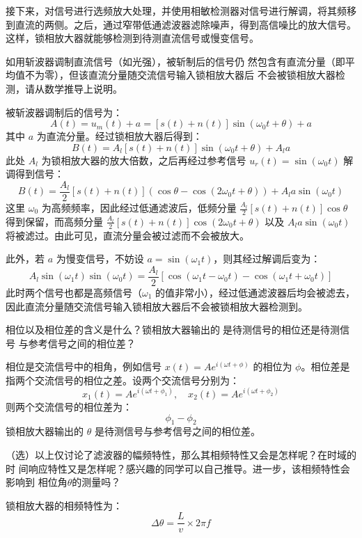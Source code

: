 \documentclass[dvipsnames, svgnames,a4paper,11pt]{article}
\begin{document}
接下来，对信号进行选频放大处理，并使用相敏检测器对信号进行解调，将其频移到直流的两侧。之后，通过窄带低通滤波器滤除噪声，得到高信噪比的放大信号。这样，锁相放大器就能够检测到待测直流信号或慢变信号。

	\begin{question}
		如用斩波器调制直流信号（如光强），被斩制后的信号仍
然包含有直流分量（即平均值不为零），但该直流分量随交流信号输入锁相放大器后
不会被锁相放大器检测，请从数学推导上说明。
	\end{question}
	被斩波器调制后的信号为：
\[
A(t) = u_m(t) + a = [s(t) + n(t)] \sin(\omega_0 t + \theta) + a
\]
其中 \(a\) 为直流分量。经过锁相放大器后得到：
\[
B(t) = A_l [s(t) + n(t)] \sin(\omega_0 t + \theta) + A_l a
\]
此处 \(A_l\) 为锁相放大器的放大倍数，之后再经过参考信号 \(u_r(t) = \sin(\omega_0 t)\) 解调得到信号：
\[
B(t) = \frac{A_l}{2} [s(t) + n(t)] (\cos \theta - \cos(2 \omega_0 t + \theta)) + A_l a \sin(\omega_0 t)
\]
这里 \(\omega_0\) 为高频频率，因此经过低通滤波后，低频分量 \(\frac{A_l}{2} [s(t) + n(t)] \cos \theta\) 得到保留，而高频分量 \(\frac{A_l}{2} [s(t) + n(t)] \cos(2 \omega_0 t + \theta)\) 以及 \(A_l a \sin(\omega_0 t)\) 将被滤过。由此可见，直流分量会被过滤而不会被放大。

此外，若 \(a\) 为慢变信号，不妨设 \(a = \sin(\omega_1 t)\)，则其经过解调后变为：
\[
A_l \sin(\omega_1 t) \sin(\omega_0 t) = \frac{A_l}{2} [\cos(\omega_1 t - \omega_0 t) - \cos(\omega_1 t + \omega_0 t)]
\]
此时两个信号也都是高频信号（\(\omega_1\) 的值非常小），经过低通滤波器后均会被滤去，因此直流分量随交流信号输入锁相放大器后不会被锁相放大器检测到。


	\begin{question}
		相位以及相位差的含义是什么？锁相放大器输出的是待测信号的相位还是待测信号
与参考信号之间的相位差？
	\end{question}
	相位是交流信号中的相角，例如信号 \(x(t) = A e^{i(\omega t + \phi)}\) 的相位为 \(\phi\)。相位差是指两个交流信号的相位之差。设两个交流信号分别为：
	\[
	x_1(t) = A e^{i(\omega t + \phi_1)}, \quad x_2(t) = A e^{i(\omega t + \phi_2)}
	\]
	则两个交流信号的相位差为：
	\[
	\phi_1 - \phi_2
	\]
	锁相放大器输出的 \(\theta\) 是待测信号与参考信号之间的相位差。

	\begin{question}
		（选）以上仅讨论了滤波器的幅频特性，那么其相频特性又会是怎样呢？在时域的时
间响应特性又是怎样呢？感兴趣的同学可以自己推导。进一步，该相频特性会影响到
相位角$\theta$的测量吗？
	\end{question}
	锁相放大器的相频特性为：
	\[
	\Delta \theta = \frac{L}{v} \times 2\pi f
	\]
\end{document}
